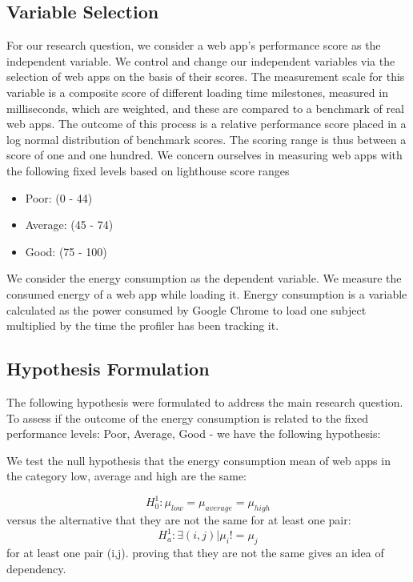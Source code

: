 \subsection{Variable Selection}

For our research question, we consider a web app's performance score as the independent variable. We control and change our independent variables via the selection of web apps on the basis of their scores. The measurement scale for this variable is a composite score of different loading time milestones, measured in milliseconds, which are weighted, and these are compared to a benchmark of real web apps. The outcome of this process is a relative performance score placed in a log normal distribution of benchmark scores. 
The scoring range is thus between a score of one and one hundred. We concern ourselves in measuring web apps with the following fixed levels based on lighthouse score ranges \cite{WEBSITE:13}

\begin{itemize}
\item Poor: (0 - 44)
\item Average: (45 - 74)
\item Good: (75 - 100)
\newline
\end{itemize}

We consider the energy consumption as the dependent variable. We measure the consumed energy of a web app while loading it. Energy consumption is a variable calculated as the power consumed by Google Chrome to load one subject multiplied by the time the profiler has been tracking it.
\newline


\subsection{Hypothesis Formulation}
The following hypothesis were formulated to address the main research question.
To assess if the outcome of the energy consumption is related to the fixed performance levels: Poor, Average, Good - we have the following hypothesis: \newline

We test the null hypothesis that the energy consumption mean of web apps in the category low, average and high are the same: 

\[ H_0^1: \mu_{low} = \mu_{average} = \mu_{high} \]
versus the alternative that they are not the same for at least one pair: \[ H_{a}^1: \exists (i,j) | \mu_{i} != \mu_{j} \]  for at least one pair (i,j).  proving that they are not the same gives an idea of dependency.

